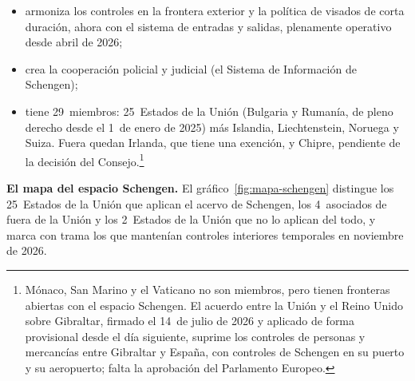 \documentclass[11pt]{article}
\begin{document}
\begin{itemize}
\begin{itemize}
  \item armoniza los controles en la frontera exterior y la política de visados de corta duración, ahora con el sistema de entradas y salidas, plenamente operativo desde abril de 2026;
  \item crea la cooperación policial y judicial (el Sistema de Información de Schengen);
  \item tiene 29~miembros: 25~Estados de la Unión (Bulgaria y Rumanía, de pleno derecho desde el 1~de enero de 2025) más Islandia, Liechtenstein, Noruega y Suiza. Fuera quedan Irlanda, que tiene una exención, y Chipre, pendiente de la decisión del Consejo.\footnote{Mónaco, San Marino y el Vaticano no son miembros, pero tienen fronteras abiertas con el espacio Schengen. El acuerdo entre la Unión y el Reino Unido sobre Gibraltar, firmado el 14~de julio de 2026 y aplicado de forma provisional desde el día siguiente, suprime los controles de personas y mercancías entre Gibraltar y España, con controles de Schengen en su puerto y su aeropuerto; falta la aprobación del Parlamento Europeo.}
  \end{itemize}
\end{itemize}

\begin{anotaciones}
\textbf{El mapa del espacio Schengen.} El gráfico~\ref{fig:mapa-schengen} distingue los 25~Estados de la Unión que aplican el acervo de Schengen, los 4~asociados de fuera de la Unión y los 2~Estados de la Unión que no lo aplican del todo, y marca con trama los que mantenían controles interiores temporales en noviembre de 2026.
\begin{figuracaja}
\centering
\caption{El espacio Schengen, noviembre de 2026}\label{fig:mapa-schengen}
\end{figuracaja}
\end{anotaciones}
\end{document}
